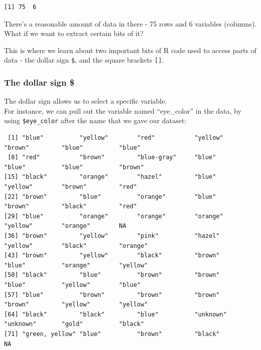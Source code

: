 \documentclass[]{book}
\newenvironment{Shaded}{\begin{snugshade}}{\end{snugshade}}
\newcommand{\NormalTok}[1]{#1}
\newcommand{\OperatorTok}[1]{\textcolor[rgb]{0.81,0.36,0.00}{\textbf{#1}}}
\begin{document}
\begin{verbatim}
[1] 75  6
\end{verbatim}

There's a reasonable amount of data in there - 75 rows and 6 variables (columns). What if we want to extract certain bits of it?

This is where we learn about two important bits of R code used to access parts of data - the dollar sign \texttt{\$}, and the square brackets \texttt{{[}{]}}.

\hypertarget{the-dollar-sign}{%
\subsubsection*{The dollar sign \$}\label{the-dollar-sign}}

The dollar sign allows us to select a specific variable.\\
For instance, we can pull out the variable named ``eye\_color'' in the data, by using \texttt{\$eye\_color} after the name that we gave our dataset:

\begin{Shaded}
\end{Shaded}

\begin{verbatim}
 [1] "blue"          "yellow"        "red"           "yellow"        "brown"         "blue"          "blue"         
 [8] "red"           "brown"         "blue-gray"     "blue"          "blue"          "blue"          "brown"        
[15] "black"         "orange"        "hazel"         "blue"          "yellow"        "brown"         "red"          
[22] "brown"         "blue"          "orange"        "blue"          "brown"         "black"         "red"          
[29] "blue"          "orange"        "orange"        "orange"        "yellow"        "orange"        NA             
[36] "brown"         "yellow"        "pink"          "hazel"         "yellow"        "black"         "orange"       
[43] "brown"         "yellow"        "black"         "brown"         "blue"          "orange"        "yellow"       
[50] "black"         "blue"          "brown"         "brown"         "blue"          "yellow"        "blue"         
[57] "blue"          "brown"         "brown"         "brown"         "brown"         "yellow"        "yellow"       
[64] "black"         "black"         "blue"          "unknown"       "unknown"       "gold"          "black"        
[71] "green, yellow" "blue"          "brown"         "black"         NA             
\end{verbatim}
\end{document}
